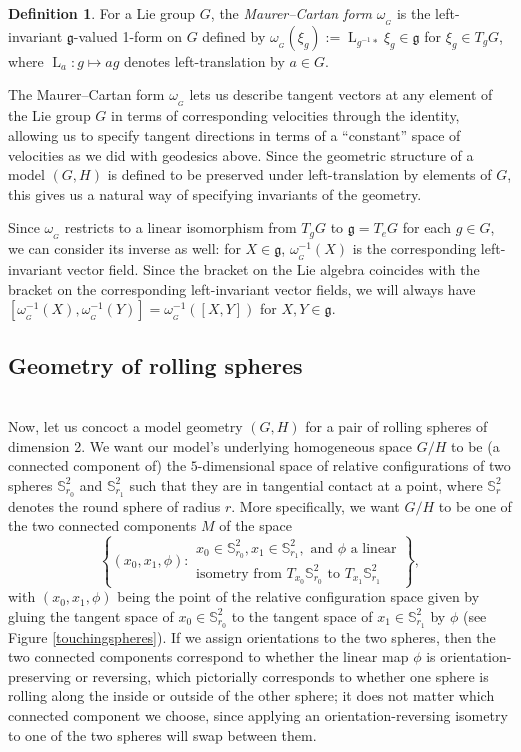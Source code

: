 \documentclass[12pt,a4paper]{amsart}
\theoremstyle{definition}
\newtheorem{definition}[theorem]{Definition}
\newcommand{\MC}[1]{\omega_{{}_{#1}}}
\newcommand{\Lt}[1]{\operatorname{L}_{#1}}
\begin{document}
\begin{definition}For a Lie group $G$, the \emph{Maurer--Cartan form} $\MC{G}$ is the left-invariant $\mathfrak{g}$-valued 1-form on $G$ defined by $\MC{G}(\xi_g):=\Lt{g^{-1}*}\xi_g\in \mathfrak{g}$ for $\xi_g\in T_gG$, where $\Lt{a}:g\mapsto ag$ denotes left-translation by $a\in G$.\end{definition}

The Maurer--Cartan form $\MC{G}$ lets us describe tangent vectors at any element of the Lie group $G$ in terms of corresponding velocities through the identity, allowing us to specify tangent directions in terms of a ``constant'' space of velocities as we did with geodesics above. Since the geometric structure of a model $(G,H)$ is defined to be preserved under left-translation by elements of $G$, this gives us a natural way of specifying invariants of the geometry.

Since $\MC{G}$ restricts to a linear isomorphism from $T_gG$ to $\mathfrak{g}=T_eG$ for each $g\in G$, we can consider its inverse as well: for $X\in\mathfrak{g}$, $\MC{G}^{-1}(X)$ is the corresponding left-invariant vector field. Since the bracket on the Lie algebra coincides with the bracket on the corresponding left-invariant vector fields, we will always have $[\MC{G}^{-1}(X),\MC{G}^{-1}(Y)]=\MC{G}^{-1}([X,Y])$ for $X,Y\in\mathfrak{g}$.

\subsection{Geometry of rolling spheres}\label{rollattach}\hfill\\
Now, let us concoct a model geometry $(G,H)$ for a pair of rolling spheres of dimension 2. We want our model's underlying homogeneous space $G/H$ to be (a connected component of) the $5$-dimensional space of relative configurations of two spheres $\mathbb{S}^2_{r_0}$ and $\mathbb{S}^2_{r_1}$ such that they are in tangential contact at a point, where $\mathbb{S}^2_r$ denotes the round sphere of radius $r$. More specifically, we want $G/H$ to be one of the two connected components $M$ of the space
\[\left\{(x_0,x_1,\phi):\begin{array}{l}x_0\in\mathbb{S}^2_{r_0}, x_1\in\mathbb{S}^2_{r_1},\text{ and } \phi \text{ a linear} \\ \text{isometry from } T_{x_0}\mathbb{S}^2_{r_0} \text{ to } T_{x_1}\mathbb{S}^2_{r_1}\end{array}\right\},\]
with $(x_0,x_1,\phi)$ being the point of the relative configuration space given by gluing the tangent space of $x_0\in\mathbb{S}^2_{r_0}$ to the tangent space of $x_1\in\mathbb{S}^2_{r_1}$ by $\phi$ (see Figure \ref{touchingspheres}). If we assign orientations to the two spheres, then the two connected components correspond to whether the linear map $\phi$ is orientation-preserving or reversing, which pictorially corresponds to whether one sphere is rolling along the inside or outside of the other sphere; it does not matter which connected component we choose, since applying an orientation-reversing isometry to one of the two spheres will swap between them.
\end{document}
